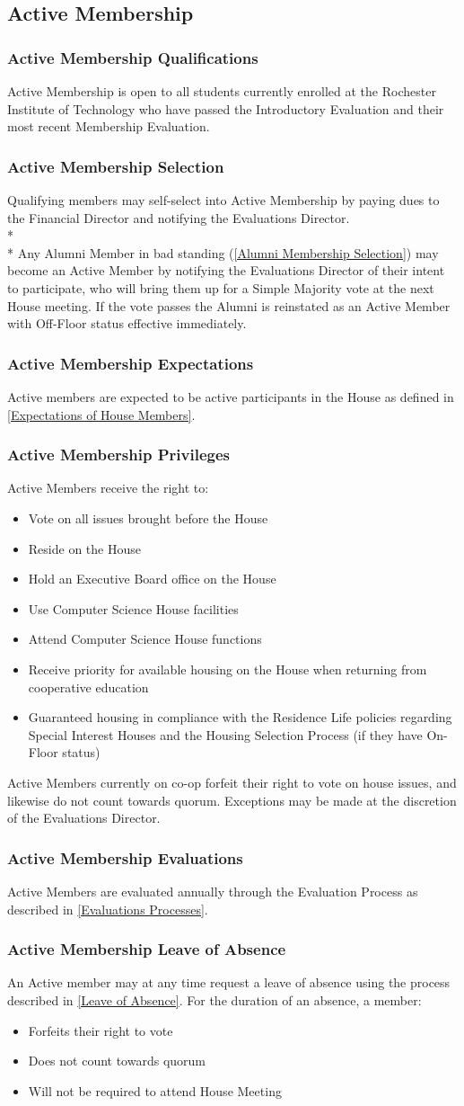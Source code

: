 \documentclass{article}
\newcommand{\asection}[1]{\subsection{#1} \label{#1}}
\newcommand{\asubsection}[1]{\subsubsection{#1} \label{#1}}
\begin{document}
\asection{Active Membership}
\asubsection{Active Membership Qualifications}
Active Membership is open to all students currently enrolled at the Rochester Institute of Technology who have passed the Introductory Evaluation and their most recent Membership Evaluation.
\asubsection{Active Membership Selection}
Qualifying members may self-select into Active Membership by paying dues to the Financial Director and notifying the Evaluations Director.
\\*\\*
Any Alumni Member in bad standing (\ref{Alumni Membership Selection}) may become an Active Member by notifying the Evaluations Director of their intent to participate, who will bring them up for a Simple Majority vote at the next House meeting.
If the vote passes the Alumni is reinstated as an Active Member with Off-Floor status effective immediately.
\asubsection{Active Membership Expectations}
Active members are expected to be active participants in the House as defined in \ref{Expectations of House Members}.
\asubsection{Active Membership Privileges}
Active Members receive the right to:
\begin{itemize}
	\item Vote on all issues brought before the House
	\item Reside on the House
	\item Hold an Executive Board office on the House
	\item Use Computer Science House facilities
	\item Attend Computer Science House functions
	\item Receive priority for available housing on the House when returning from cooperative education
	\item Guaranteed housing in compliance with the Residence Life policies regarding Special Interest Houses and the Housing Selection Process (if they have On-Floor status)
\end{itemize}
Active Members currently on co-op forfeit their right to vote on house issues, and likewise do not count towards quorum.
Exceptions may be made at the discretion of the Evaluations Director.
\asubsection{Active Membership Evaluations}
Active Members are evaluated annually through the Evaluation Process as described in \ref{Evaluations Processes}.
\asubsection{Active Membership Leave of Absence}
An Active member may at any time request a leave of absence using the process described in \ref{Leave of Absence}.
For the duration of an absence, a member:
\begin{itemize}
	\item Forfeits their right to vote
	\item Does not count towards quorum
	\item Will not be required to attend House Meeting
\end{itemize}
\end{document}
